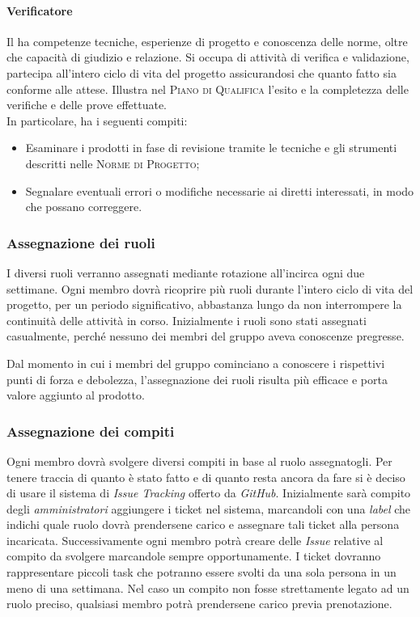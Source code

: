 \paragraph{Verificatore}

Il \emph{} ha competenze tecniche, esperienze di progetto e conoscenza delle norme, oltre che 
capacità di giudizio e relazione. Si occupa di attività di verifica e validazione, partecipa all'intero ciclo di vita 
del progetto assicurandosi che quanto fatto sia conforme alle attese. Illustra nel \textsc{Piano di Qualifica} l'esito 
e la completezza delle verifiche e delle prove effettuate.\\
In particolare, ha i seguenti compiti:
\begin{itemize}
    \item Esaminare i prodotti in fase di revisione tramite le tecniche e gli strumenti descritti nelle \textsc{Norme di Progetto};
    \item Segnalare eventuali errori o modifiche necessarie ai diretti interessati, in modo che possano correggere.
\end{itemize}

\subsubsection{Assegnazione dei ruoli}

I diversi ruoli verranno assegnati mediante rotazione all'incirca ogni due settimane. Ogni membro 
dovrà ricoprire più ruoli durante l'intero ciclo di vita del progetto, per un periodo significativo, abbastanza lungo 
da non interrompere la continuità delle attività in corso. Inizialmente i ruoli sono stati assegnati casualmente, 
perché nessuno dei membri del gruppo aveva conoscenze pregresse. 

Dal momento in cui i membri del gruppo cominciano a conoscere i rispettivi punti di forza e debolezza, l'assegnazione dei ruoli risulta 
più efficace e porta valore aggiunto al prodotto.

\subsubsection{Assegnazione dei compiti}

Ogni membro dovrà svolgere diversi compiti in base al ruolo assegnatogli. Per tenere traccia di quanto è stato fatto e 
di quanto resta ancora da fare si è deciso di usare il sistema di \emph{Issue Tracking} offerto da \emph{GitHub}. Inizialmente sarà compito 
degli \emph{amministratori} aggiungere i ticket nel sistema, marcandoli con una \emph{label} che indichi quale ruolo 
dovrà prendersene carico e assegnare tali ticket alla persona incaricata. Successivamente ogni membro potrà creare delle \emph{Issue} 
relative al compito da svolgere marcandole sempre opportunamente. I ticket dovranno rappresentare piccoli task che potranno essere svolti 
da una sola persona in un meno di una settimana. Nel caso un compito non fosse strettamente legato ad un ruolo preciso, qualsiasi membro 
potrà prendersene carico previa prenotazione.

